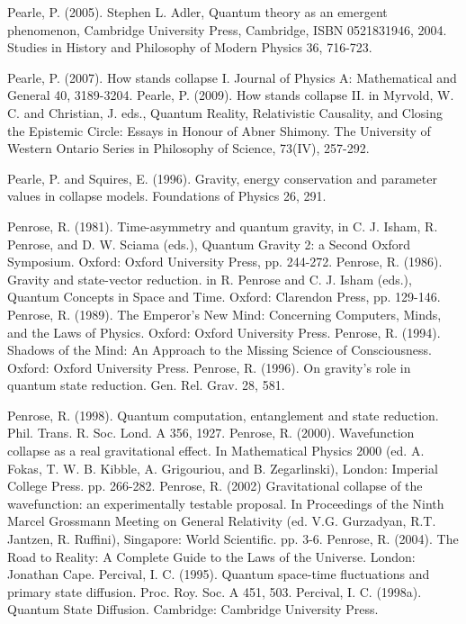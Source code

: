 \begin{thebibliography}{}
\bibitem{} Pearle, P. (2005). Stephen L. Adler, Quantum theory as an emergent phenomenon, Cambridge University Press, Cambridge, ISBN 0521831946, 2004. Studies in History and Philosophy of Modern Physics 36, 716-723.

\bibitem{} Pearle, P. (2007). How stands collapse I. Journal of Physics A: Mathematical and General 40, 3189-3204.
\bibitem{} Pearle, P. (2009). How stands collapse II. in Myrvold, W. C. and Christian, J.  eds., Quantum Reality, Relativistic Causality, and Closing the Epistemic Circle: Essays in Honour of Abner Shimony. The University of Western Ontario Series in Philosophy of Science, 73(IV), 257-292.

\bibitem{} Pearle, P. and Squires, E. (1996). Gravity, energy conservation and parameter values in collapse models. Foundations of Physics 26, 291.

\bibitem{} Penrose, R.  (1981). Time-asymmetry and quantum gravity, in C. J. Isham, R. Penrose, and D. W. Sciama (eds.), Quantum Gravity 2: a Second Oxford Symposium. Oxford: Oxford University Press, pp.
244-272.
\bibitem{} Penrose, R. (1986). Gravity and state-vector reduction. in R. Penrose and C. J. Isham (eds.), Quantum Concepts in Space and Time. Oxford: Clarendon Press, pp. 129-146.
\bibitem{} Penrose, R. (1989). The Emperor's New Mind: Concerning Computers, Minds, and the Laws of Physics. Oxford: Oxford University Press.
\bibitem{} Penrose, R. (1994). Shadows of the Mind: An Approach to the Missing Science of Consciousness. Oxford: Oxford University Press.
\bibitem{} Penrose, R. (1996). On gravity's role in quantum state reduction. Gen. Rel. Grav. 28, 581.

\bibitem{} Penrose, R. (1998). Quantum computation, entanglement and state reduction. Phil. Trans. R. Soc. Lond. A 356, 1927.
\bibitem{} Penrose, R. (2000). Wavefunction collapse as a real gravitational effect. In Mathematical Physics 2000 (ed. A. Fokas, T. W. B. Kibble, A. Grigouriou, and B. Zegarlinski), London: Imperial College Press. pp. 266-282. 
\bibitem{} Penrose, R. (2002) Gravitational collapse of the wavefunction: an experimentally testable proposal. 
In Proceedings of the Ninth Marcel Grossmann Meeting on General Relativity (ed. V.G. Gurzadyan, R.T. Jantzen, R. Ruffini), Singapore: World Scientific. pp. 3-6.
\bibitem{} Penrose, R. (2004). The Road to Reality: A Complete Guide to the Laws of the Universe. London: Jonathan Cape.
\bibitem{} Percival, I. C. (1995). Quantum space-time fluctuations and primary state diffusion. Proc. Roy. Soc. A 451, 503. 
\bibitem{} Percival, I. C. (1998a). Quantum State Diffusion. Cambridge: Cambridge University Press.


\end{thebibliography}
